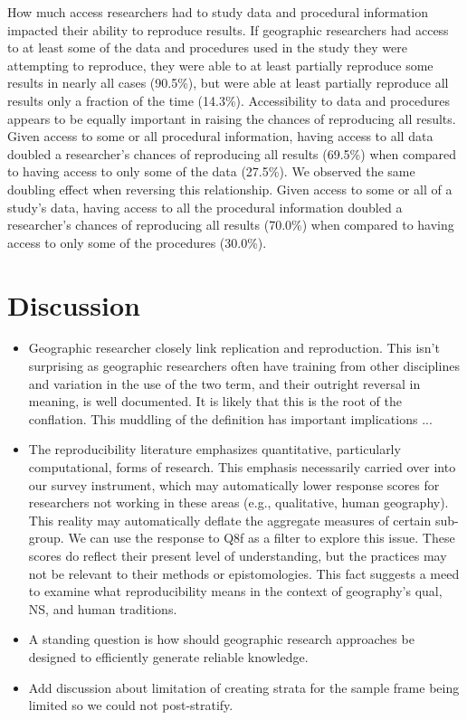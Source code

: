 \documentclass[]{interact}
\theoremstyle{plain}%
\theoremstyle{definition}
\theoremstyle{remark}
\begin{document}
How much access researchers had to study data and procedural information impacted their ability to reproduce results. 
If geographic researchers had access to at least some of the data and procedures used in the study they were attempting to reproduce, they were able to at least partially reproduce some results in nearly all cases (90.5\%), but were able at least partially reproduce all results only a fraction of the time (14.3\%).
Accessibility to data and procedures appears to be equally important in raising the chances of reproducing all results. 
Given access to some or all procedural information, having access to all data doubled a researcher's chances of reproducing all results (69.5\%) when compared to having access to only some of the data (27.5\%). 
We observed the same doubling effect when reversing this relationship. 
Given access to some or all of a study's data, having access to all the procedural information doubled a researcher's chances of reproducing all results (70.0\%) when compared to having access to only some of the procedures (30.0\%).


\section*{Discussion}

\begin{itemize}
    \item Geographic researcher closely link replication and reproduction. This isn't surprising as geographic researchers often have training from other disciplines and variation in the use of the two term, and their outright reversal in meaning, is well documented. It is likely that this is the root of the conflation. This muddling of the definition has important implications ...
    \item The reproducibility literature emphasizes quantitative, particularly computational, forms of research. This emphasis necessarily carried over into our survey instrument, which may automatically lower response scores for researchers not working in these areas (e.g., qualitative, human geography). This reality may automatically deflate the aggregate measures of certain sub-group. We can use the response to Q8f as a filter to explore this issue. These scores do reflect their present level of understanding, but the practices may not be relevant to their methods or epistomologies. This fact suggests a meed to examine what reproducibility means in the context of geography's qual, NS, and human traditions.
    \item A standing question is how should geographic research approaches be designed to efficiently generate reliable knowledge.
    \item Add discussion about limitation of creating strata for the sample frame being limited so we could not post-stratify.
\end{itemize}
\end{document}
